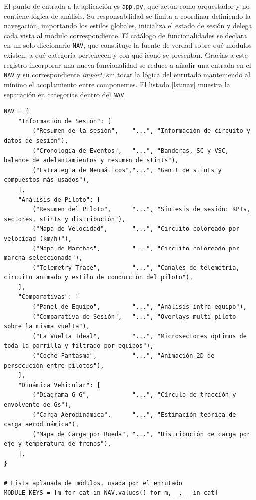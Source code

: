 \documentclass[12pt,a4paper,twoside,openright]{book}
\begin{document}
\noindent El punto de entrada a la aplicación es \texttt{app.py}, que actúa como orquestador y no contiene lógica de análisis. Su responsabilidad se limita a coordinar definiendo la navegación, importando los estilos globales, inicializa el estado de sesión y delega cada vista al módulo correspondiente. El catálogo de funcionalidades se declara en un solo diccionario \texttt{NAV}, que constituye la fuente de verdad sobre qué módulos existen, a qué categoría pertenecen y con qué icono se presentan.
Gracias a este registro incorporar una nueva funcionalidad se reduce a añadir una entrada en el \texttt{NAV} y su correspondiente \textit{import}, sin tocar la lógica del enrutado manteniendo al mínimo el acoplamiento entre componentes.
El listado \ref{lst:nav} muestra la separación en categorías dentro del \texttt{NAV}.
\begin{lstlisting}[style=python,caption={Registro declarativo de la navegación en \texttt{app.py}.},label=lst:nav]
NAV = {
    "Información de Sesión": [
        ("Resumen de la sesión",    "...", "Información de circuito y datos de sesión"),
        ("Cronología de Eventos",   "...", "Banderas, SC y VSC, balance de adelantamientos y resumen de stints"),
        ("Estrategia de Neumáticos","...", "Gantt de stints y compuestos más usados"),
    ],
    "Análisis de Piloto": [
        ("Resumen del Piloto",      "...", "Síntesis de sesión: KPIs, sectores, stints y distribución"),
        ("Mapa de Velocidad",       "...", "Circuito coloreado por velocidad (km/h)"),
        ("Mapa de Marchas",         "...", "Circuito coloreado por marcha seleccionada"),
        ("Telemetry Trace",         "...", "Canales de telemetría, circuito animado y estilo de conducción del piloto"),
    ],
    "Comparativas": [
        ("Panel de Equipo",         "...", "Análisis intra-equipo"),
        ("Comparativa de Sesión",   "...", "Overlays multi-piloto sobre la misma vuelta"),
        ("La Vuelta Ideal",         "...", "Microsectores óptimos de toda la parrilla y filtrado por equipos"),
        ("Coche Fantasma",          "...", "Animación 2D de persecución entre pilotos"),
    ],
    "Dinámica Vehicular": [
        ("Diagrama G-G",            "...", "Círculo de tracción y envolvente de Gs"),
        ("Carga Aerodinámica",      "...", "Estimación teórica de carga aerodinámica"),
        ("Mapa de Carga por Rueda", "...", "Distribución de carga por eje y temperatura de frenos"),
    ],
}

# Lista aplanada de módulos, usada por el enrutado
MODULE_KEYS = [m for cat in NAV.values() for m, _, _ in cat]
\end{lstlisting}
\end{document}
